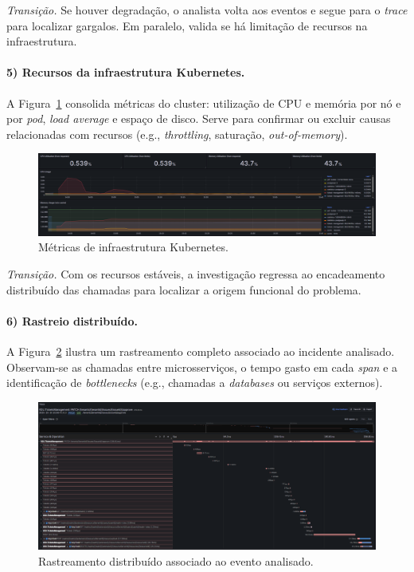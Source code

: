 \textit{Transição.} Se houver degradação, o analista volta aos eventos e segue para o \textit{trace} para localizar gargalos. Em paralelo, valida se há limitação de recursos na infraestrutura.

\paragraph{5) Recursos da infraestrutura Kubernetes.}

A Figura~\ref{fig:dash-5} consolida métricas do cluster: utilização de CPU e memória por nó e por \textit{pod}, \textit{load average} e espaço de disco. Serve para confirmar ou excluir causas relacionadas com recursos (e.g., \textit{throttling}, saturação, \textit{out-of-memory}).

\begin{figure}[H]
    \centering
    \includegraphics[width=\textwidth]{images/Grafana/cpu_memory_dashboard.png}
    \caption{Métricas de infraestrutura Kubernetes.}
    \label{fig:dash-5}
\end{figure}

 \textit{Transição.} Com os recursos estáveis, a investigação regressa ao encadeamento distribuído das chamadas para localizar a origem funcional do problema.

\paragraph{6) Rastreio distribuído.}

A Figura~\ref{fig:dash-6} ilustra um rastreamento completo associado ao incidente analisado. Observam-se as chamadas entre microsserviços, o tempo gasto em cada \textit{span} e a identificação de \textit{bottlenecks} (e.g., chamadas a \textit{databases} ou serviços externos).

\begin{figure}[H]
    \centering
    \includegraphics[width=\textwidth]{images/Grafana/trace_approve.png}
    \caption{Rastreamento distribuído associado ao evento analisado.}
    \label{fig:dash-6}
\end{figure}

